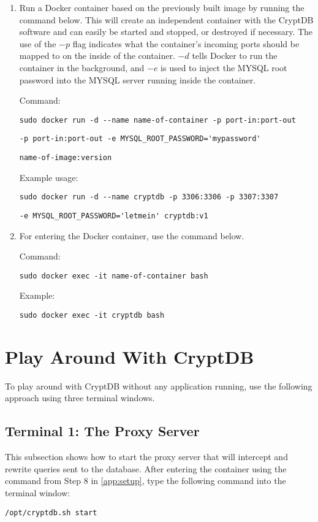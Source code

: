 \begin{enumerate}
\item Run a Docker container based on the previously built image by running the command below. This will create an independent container with the CryptDB software and can easily be started and stopped, or destroyed if necessary. The use of the $-p$ flag indicates what the container's incoming ports should be mapped to on the inside of the container. $-d$ tells Docker to run the container in the background, and $-e$ is used to inject the MYSQL root password into the MYSQL server running inside the container.

Command:

\verb!sudo docker run -d --name name-of-container -p port-in:port-out!

\verb!-p port-in:port-out -e MYSQL_ROOT_PASSWORD='mypassword'!

\verb!name-of-image:version!

Example usage:

\verb!sudo docker run -d --name cryptdb -p 3306:3306 -p 3307:3307!

\verb!-e MYSQL_ROOT_PASSWORD='letmein' cryptdb:v1!

\item For entering the Docker container, use the command below.

Command:

\verb!sudo docker exec -it name-of-container bash!

Example:

\verb!sudo docker exec -it cryptdb bash!

\end{enumerate}


\section{Play Around With CryptDB}
\label{app:playaround}
To play around with CryptDB without any application running, use the following approach using three terminal windows.

\subsection{Terminal 1: The Proxy Server}
This subsection shows how to start the proxy server that will intercept and rewrite queries sent to the database. After entering the container using the command from Step 8 in \ref{app:setup}, type the following command into the terminal window:

\verb!/opt/cryptdb.sh start!

